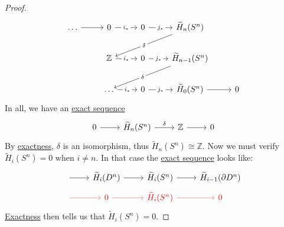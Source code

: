 \begin{proof}
	\[
		\begin{tikzcd}
			\ldots & {0} & {0} & {\widetilde{H}_n(S^n)} \\
			& {\mathbb{Z} } & {0} & {\widetilde{H}_{n-1}(S^n)} \\
			& \ldots & {0} & {\widetilde{H}_{0}(S^n)} & 0
			\arrow["{j_\ast}"{description}, from=1-3, to=1-4]
			\arrow["{j_\ast}"{description}, from=2-3, to=2-4]
			\arrow[from=3-4, to=3-5]
			\arrow["{i_\ast}"{description}, from=2-2, to=2-3]
			\arrow["{i_\ast}"{description}, from=1-2, to=1-3]
			\arrow[from=1-1, to=1-2]
			\arrow["\delta"{description}, from=1-4, to=2-2]
			\arrow["\delta"{description}, from=2-4, to=3-2]
			\arrow["{j_\ast}"{description}, from=3-3, to=3-4]
			\arrow["{i_\ast}"{description}, from=3-2, to=3-3]
		\end{tikzcd}
	\]
	In all, we have an \hyperref[def:exact-sequence]{exact sequence}
	\[
		\begin{tikzcd}
			0 & {\widetilde{H}_n(S^n)} & {\mathbb{Z}} & 0
			\arrow["\delta", from=1-2, to=1-3]
			\arrow[from=1-3, to=1-4]
			\arrow[from=1-1, to=1-2]
		\end{tikzcd}
	\]
	By \hyperref[def:exact]{exactness}, \(\delta\) is an isomorphism, thus \(\widetilde{H}_n(S^n) \cong \mathbb{Z}\). Now we must verify \(\widetilde{H}_i(S^n) = 0\)
	when \(i\neq n\). In that case the \hyperref[def:exact-sequence]{exact sequence} looks like:
	\[
		\begin{tikzcd}[row sep=tiny]
			{} & {\widetilde{H}_i(D^n)} & {\widetilde{H}_i(S^n)} & {\widetilde{H}_{i-1}(\partial D^n)} \\
			{} & \color{red}0 & \color{red}{\widetilde{H}_i(S^n)} & \color{red}0
			\arrow[from=1-2, to=1-3]
			\arrow[from=1-3, to=1-4]
			\arrow[from=1-1, to=1-2]
			\arrow[color={rgb,255:red,214;green,92;blue,92}, from=2-1, to=2-2]
			\arrow[color={rgb,255:red,214;green,92;blue,92}, from=2-2, to=2-3]
			\arrow[color={rgb,255:red,214;green,92;blue,92}, from=2-3, to=2-4]
		\end{tikzcd}
	\]
	\hyperref[def:exact]{Exactness} then tells us that \(\widetilde{H}_i(S^n) = 0\).
\end{proof}

